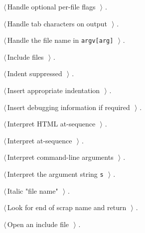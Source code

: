 \documentclass{report}
\begin{document}
{\begin{list}{}{\setlength{\itemsep}{-\parsep}\setlength{\itemindent}{-\leftmargin}}
\item $\langle\,$Handle optional per-file flags\nobreak\ {\footnotesize {}}$\,\rangle$ {\footnotesize {\NWtxtRefIn} .}
\item $\langle\,$Handle tab characters on output\nobreak\ {\footnotesize {}}$\,\rangle$ {\footnotesize {\NWtxtRefIn} .}
\item $\langle\,$Handle the file name in \verb|argv[arg]|\nobreak\ {\footnotesize {}}$\,\rangle$ {\footnotesize {\NWtxtRefIn} .}
\item $\langle\,$Include files\nobreak\ {\footnotesize {}}$\,\rangle$ {\footnotesize {\NWtxtRefIn} .}
\item $\langle\,$Indent suppressed\nobreak\ {\footnotesize {}}$\,\rangle$ {\footnotesize {\NWtxtRefIn} .}
\item $\langle\,$Insert appropriate indentation\nobreak\ {\footnotesize {}}$\,\rangle$ {\footnotesize {\NWtxtRefIn} .
}
\item $\langle\,$Insert debugging information if required\nobreak\ {\footnotesize {}}$\,\rangle$ {\footnotesize {\NWtxtRefIn} .
}
\item $\langle\,$Interpret HTML at-sequence\nobreak\ {\footnotesize {}}$\,\rangle$ {\footnotesize {\NWtxtRefIn} .}
\item $\langle\,$Interpret at-sequence\nobreak\ {\footnotesize {}}$\,\rangle$ {\footnotesize {\NWtxtRefIn} .}
\item $\langle\,$Interpret command-line arguments\nobreak\ {\footnotesize {}}$\,\rangle$ {\footnotesize {\NWtxtRefIn} .}
\item $\langle\,$Interpret the argument string \verb|s|\nobreak\ {\footnotesize {}}$\,\rangle$ {\footnotesize {\NWtxtRefIn} .}
\item $\langle\,$Italic "file name"\nobreak\ {\footnotesize {}}$\,\rangle$ {\footnotesize {\NWtxtRefIn} .}
\item $\langle\,$Look for end of scrap name and return\nobreak\ {\footnotesize {}}$\,\rangle$ {\footnotesize {\NWtxtRefIn} .}
\item $\langle\,$Open an include file\nobreak\ {\footnotesize {}}$\,\rangle$ {\footnotesize {\NWtxtRefIn} .}

\end{list}}
\end{document}
